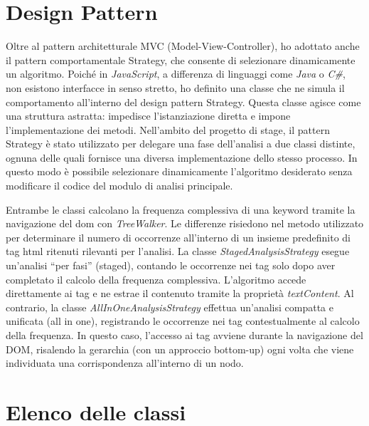 \section{Design Pattern}
\label{sec:design-pattern}

\par Oltre al pattern architetturale MVC (Model-View-Controller), ho adottato anche il pattern comportamentale Strategy, che consente di selezionare dinamicamente un algoritmo. Poiché in \textit{JavaScript}, a differenza di linguaggi come \textit{Java} o \textit{C\#}, non esistono interfacce in senso stretto, ho definito una classe che ne simula il comportamento all’interno del design  pattern Strategy. Questa classe agisce come una struttura astratta: impedisce l'istanziazione diretta e impone l’implementazione dei metodi. Nell’ambito del progetto di stage, il pattern Strategy è stato utilizzato per delegare una fase dell’analisi a due classi distinte, ognuna delle quali fornisce una diversa implementazione dello stesso processo. In questo modo è possibile selezionare dinamicamente l’algoritmo desiderato senza modificare il codice del modulo di analisi principale.

\vspace{10pt}
\par\noindent Entrambe le classi calcolano la frequenza complessiva di una keyword tramite la navigazione del \gls{dom} con \textit{TreeWalker}. Le differenze risiedono nel metodo utilizzato per determinare il numero di occorrenze all’interno di un insieme predefinito di tag \gls{html} ritenuti rilevanti per l’analisi. La classe \textit{StagedAnalysisStrategy} esegue un’analisi “per fasi” (staged), contando le occorrenze nei tag solo dopo aver completato il calcolo della frequenza complessiva. L’algoritmo accede direttamente ai tag e ne estrae il contenuto tramite la proprietà \textit{textContent}. Al contrario, la classe \textit{AllInOneAnalysisStrategy} effettua un’analisi compatta e unificata (all in one), registrando le occorrenze nei tag contestualmente al calcolo della frequenza. In questo caso, l’accesso ai tag avviene durante la navigazione del DOM, risalendo la gerarchia (con un approccio bottom-up) ogni volta che viene individuata una corrispondenza all’interno di un nodo.

\section{Elenco delle classi}
\label{sec:elenco-classi}

